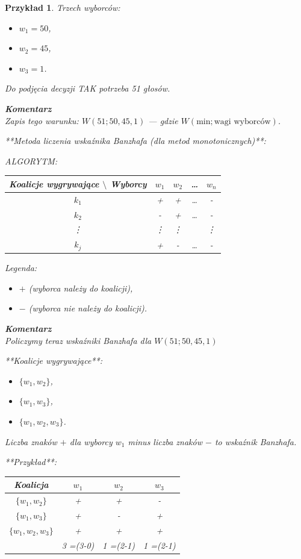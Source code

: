 \documentclass[12pt,a4paper]{article}
\theoremstyle{break}
\newcommand{\Komentarz}[1]{
	\begin{mdframed}[style=zadanie]
		\textbf{Komentarz}\\
		#1
	\end{mdframed}
	}
\newtheorem{example}{Przykład}[section]
\begin{document}
	\begin{example}
		Trzech wyborców:
		\begin{itemize}
			\item $w_1 = 50$,
			\item $w_2 = 45$,
			\item $w_3 = 1$.
		\end{itemize}
		
		Do podjęcia decyzji TAK potrzeba 51 głosów.  
		\Komentarz{Zapis tego warunku: $W(51; 50, 45, 1)$ — gdzie $W(\text{min}; \text{wagi wyborców})$.}
		\newpage
		
		**Metoda liczenia wskaźnika Banzhafa (dla metod monotonicznych)**:
		
		ALGORYTM:  
		\begin{tabular}{c|cccc}
			Koalicje wygrywające $\setminus$ Wyborcy & $w_1$ & $w_2$ & \dots & $w_n$ \\ \hline
			$k_1$ & + & + & \dots & - \\
			$k_2$ & - & + & \dots & - \\
			\vdots & \vdots & \vdots & & \vdots \\
			$k_j$ & + & - & \dots & - \\
		\end{tabular}
	
		Legenda:
		\begin{itemize}
			\item $+$ (wyborca należy do koalicji),
			\item $-$ (wyborca nie należy do koalicji).
		\end{itemize}
	
		\Komentarz{Policzymy teraz wskaźniki Banzhafa dla $W(51;50,45,1)$}
		
		**Koalicje wygrywające**:
		\begin{itemize}
			\item $\{w_1, w_2\}$,
			\item $\{w_1, w_3\}$,
			\item $\{w_1, w_2, w_3\}$.
		\end{itemize}
	
		
	
		
		
		Liczba znaków $+$ dla wyborcy $w_1$ minus liczba znaków $-$ to wskaźnik Banzhafa.
		
		**Przykład**:
		\begin{tabular}{c|ccc}
			Koalicja & $w_1$ & $w_2$ & $w_3$ \\ \hline
			$\{w_1, w_2\}$ & + & + & - \\
			$\{w_1, w_3\}$ & + & - & + \\
			$\{w_1, w_2, w_3\}$ & + & + & + \\
			& 3 =(3-0) & 1 =(2-1) & 1 =(2-1) \\
		\end{tabular}\\\\
		

\end{example}
\end{document}
